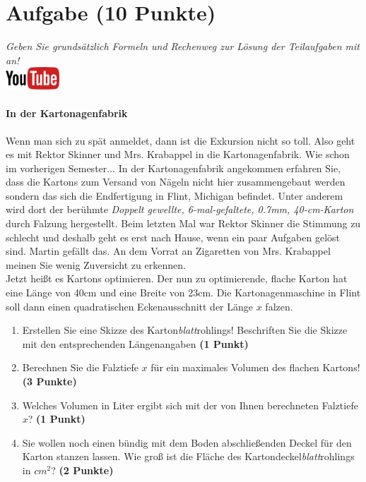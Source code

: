 \documentclass[a4paper, 9pt]{scrartcl}\usepackage[]{graphicx}\usepackage[]{xcolor}
\begin{document}
 
\clearpage

\section{Aufgabe \hfill (10 Punkte)}

\textit{Geben Sie grunds{\"a}tzlich Formeln und Rechenweg zur L{\"o}sung der
  Teilaufgaben mit an!} \\[1Ex]

\hfill\href{https://youtu.be/RuzMjwvwT-4}{\includegraphics[width =
  2cm]{img/youtube}} %
\hspace{2Ex}

\paragraph{In der Kartonagenfabrik}



Wenn man sich zu sp{\"a}t anmeldet, dann ist die Exkursion nicht so toll. Also
geht es mit Rektor Skinner und Mrs. Krabappel in die Kartonagenfabrik. Wie
schon im vorherigen Semester... In der Kartonagenfabrik angekommen erfahren
Sie, dass die Kartons zum Versand von N{\"a}geln nicht hier zusammengebaut
werden sondern das sich die Endfertigung in Flint, Michigan befindet. Unter
anderem wird dort der ber{\"u}hmte \textit{Doppelt gewellte,
  6-mal-gefaltete, 0.7mm, 40-cm-Karton} durch
Falzung hergestellt. Beim letzten Mal war Rektor Skinner die Stimmung zu
schlecht und deshalb geht es erst nach Hause, wenn ein paar Aufgaben gel{\"o}st
sind. Martin gef{\"a}llt das. An dem Vorrat
an Zigaretten von Mrs. Krabappel meinen Sie wenig Zuversicht zu erkennen.\\

Jetzt hei{\ss}t es Kartons optimieren. Der nun zu optimierende, flache Karton
hat eine L{\"a}nge von 40cm und eine Breite von 23cm. Die
Kartonagenmaschine in Flint soll dann einen quadratischen Eckenausschnitt
der L{\"a}nge $x$ falzen.

\begin{enumerate}
\item Erstellen Sie eine Skizze des Karton\textit{blatt}rohlings!
  Beschriften Sie die Skizze mit den entsprechenden L{\"a}ngenangaben
  \textbf{(1 Punkt)}
\item Berechnen Sie die Falztiefe $x$ f{\"u}r ein maximales Volumen des flachen
  Kartons! \textbf{(3 Punkte)}
\item Welches Volumen in Liter ergibt sich mit der von Ihnen berechneten
  Falztiefe $x$?  \textbf{(1 Punkt)}
\item Sie wollen noch einen b{\"u}ndig mit dem Boden abschlie{\ss}enden Deckel f{\"u}r
  den Karton stanzen lassen. Wie gro{\ss} ist die Fl{\"a}che des
  Kartondeckel\textit{blatt}rohlings in $cm^2$? \textbf{(2 Punkte)}
\end{enumerate}
\end{document}
